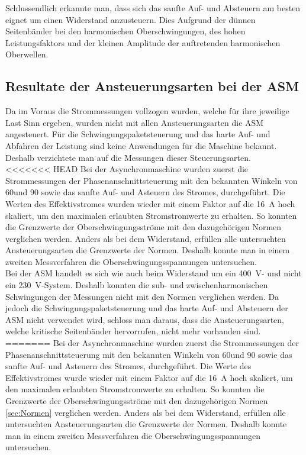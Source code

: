 Schlussendlich erkannte man, dass sich das sanfte Auf- und Absteuern am besten eignet um einen Widerstand anzusteuern. Dies Aufgrund der dünnen Seitenbänder bei den harmonischen Oberschwingungen, des hohen Leistungsfaktors und der kleinen Amplitude der auftretenden harmonischen Oberwellen. 

\subsection{Resultate der Ansteuerungsarten bei der ASM}
Da im Voraus die Strommessungen vollzogen wurden, welche für ihre jeweilige Last Sinn ergeben, wurden nicht mit allen Ansteuerungsarten die ASM angesteuert. Für die Schwingungspaketsteuerung und das harte Auf- und Abfahren der Leistung sind keine Anwendungen für die Maschine bekannt. Deshalb verzichtete man auf die Messungen dieser Steuerungsarten.\\


<<<<<<< HEAD
Bei der Asynchronmaschine wurden zuerst die Strommessungen der Phasenanschnittsteuerung mit den bekannten Winkeln von 60\textdegree und 90\textdegree \hspace{0.02cm} sowie das sanfte Auf- und Asteuern des Stromes, durchgeführt. Die Werten des Effektivstromes wurden wieder mit einem Faktor auf die \SI{16}{A} hoch skaliert, um den maximalen erlaubten Stromstromwerte zu erhalten. So konnten die Grenzwerte der Oberschwingungsströme mit den dazugehörigen Normen verglichen werden. Anders als bei dem Widerstand, erfüllen alle untersuchten Ansteuerungsarten die Grenzwerte der Normen. Deshalb konnte man in einem zweiten Messverfahren die Oberschwingungsspannungen untersuchen.\\

Bei der ASM handelt es sich wie auch beim Widerstand um ein \SI{400}{V}- und nicht ein \SI{230}{V}-System. Deshalb konnten die sub- und zwischenharmonischen Schwingungen der Messungen nicht mit den Normen verglichen werden.
Da jedoch die Schwingungspaketsteuerung und das harte Auf- und Absteuern der ASM nicht verwendet wird, schloss man daraus, dass die Ansteuerungsarten, welche kritische Seitenbänder hervorrufen, nicht mehr vorhanden sind. 
=======
Bei der Asynchronmaschine wurden zuerst die Strommessungen der Phasenanschnittsteuerung mit den bekannten Winkeln von 60\textdegree und 90\textdegree \hspace{0.02cm} sowie das sanfte Auf- und Asteuern des Stromes, durchgeführt. Die Werte des Effektivstromes wurde wieder mit einem Faktor auf die \SI{16}{A} hoch skaliert, um den maximalen erlaubten Stromstromwerte zu erhalten. So konnten die Grenzwerte der Oberschwingungsströme mit den dazugehörigen Normen \ref{sec:Normen} verglichen werden. Anders als bei dem Widerstand, erfüllen alle untersuchten Ansteuerungsarten die Grenzwerte der Normen. Deshalb konnte man in einem zweiten Messverfahren die Oberschwingungsspannungen untersuchen.\\

